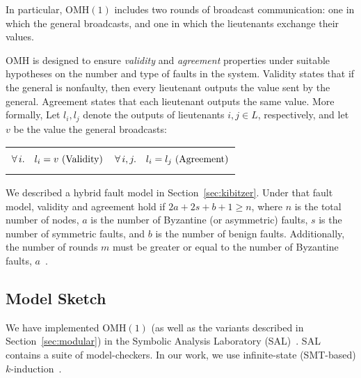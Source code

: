 \documentclass{llncs/llncs}
\newcommand{\OMH}{\ensuremath{\mathrm{OMH}}\xspace}
\begin{document}
\noindent
In particular, $\OMH(1)$ includes two rounds of broadcast communication: one in which the general broadcasts, and one in which the lieutenants exchange their values.

$\OMH$ is designed to ensure \emph{validity} and \emph{agreement} properties under suitable hypotheses on the number and type of faults in the system. Validity states that if the general is nonfaulty, then every lieutenant outputs the value sent by the general. Agreement states that each lieutenant outputs the same value. More formally, Let $l_i, l_j$ denote the outputs of lieutenants $i, j \in L$, respectively, and let $v$ be the value the general broadcasts:
\vspace{-0.4cm}
\noindent
\begin{center}
\begin{tabular}{l|l}
\begin{minipage}[t]{0.5\linewidth}
\begin{equation*}
    \forall \,i. \quad l_i = v \textnormal{ (Validity)}
\end{equation*}
\end{minipage}&
\begin{minipage}[t]{0.5\linewidth}
\begin{equation*}
    \forall \,i, j. \quad l_i = l_j \textnormal{ (Agreement)}
\end{equation*}
\end{minipage}
\end{tabular}
\end{center}
%

%
%

We described a hybrid fault model in Section~\ref{sec:kibitzer}. Under that fault model, validity and agreement hold if $2a+2s+b+1 \geq n$, where $n$ is the total number of nodes, $a$ is the number of Byzantine (or asymmetric) faults, $s$ is the number of symmetric faults, and $b$ is the number of benign faults. Additionally, the number of rounds $m$ must be greater or equal to the number of Byzantine faults, $a$~\cite{Lincoln-Rushby,hybrid}.


\subsection{Model Sketch}\label{sec:sketch}

We have implemented $\OMH(1)$ (as well as the variants described in Section~\ref{sec:modular}) in the Symbolic Analysis Laboratory (SAL)~\cite{SAL}. SAL contains a suite of model-checkers. In our work, we use infinite-state (SMT-based) $k$-induction~\cite{cal}.
\end{document}
